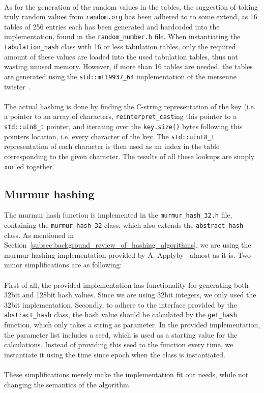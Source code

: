 \documentclass[11pt]{report} %
\begin{document}
\\
As for the generation of the random values in the tables, the suggestion of taking truly random values from \verb|random.org| has been adhered to to some extend, as 16 tables of 256 entries each has been generated and hardcoded into the implementation, found in the \verb|random_number.h| file. When instantiating the \verb|tabulation_hash| class with 16 or less tabulation tables, only the required amount of these values are loaded into the used tabulation tables, thus not wasting unused memory. However, if more than 16 tables are needed, the tables are generated using the \verb|std::mt19937_64| implementation of the mersenne twister~\cite{MT02}.\\
\\
The actual hashing is done by finding the C-string representation of the key (i.e. a pointer to an array of characters, \verb|reinterpret_cast|ing this pointer to a \verb|std::uin8_t| pointer, and iterating over the \verb|key.size()| bytes following this pointers location, i.e. every character of the key. The \verb|std::uint8_t| representation of each character is then used as an index in the table corresponding to the given character. The results of all these lookups are simply \verb|xor|'ed together.

\subsection{Murmur hashing}
\label{subsec:implementation_murmur_hash}
The murmur hash function is implemented in the \verb|murmur_hash_32.h| file, containing the \verb|murmur_hash_32| class, which also extends the \verb|abstract_hash| class. As mentioned in Section~\ref{subsec:background_review_of_hashing_algorithms}, we are using the murmur hashing implementation provided by A. Applyby~\cite{Mur3} almost as it is. Two minor simplifications are as following:\\
\\
First of all, the provided implementation has functionality for generating both 32bit and 128bit hash values. Since we are using 32bit integers, we only used the 32bit implementation. Secondly, to adhere to the interface provided by the \verb|abstract_hash| class, the hash value should be calculated by the \verb|get_hash| function, which only takes a string as parameter. In the provided implementation, the parameter list includes a seed, which is used as a starting value for the calculations. Instead of providing this seed to the function every time, we instantiate it using the time since epoch when the class is instantiated. \\
\\
These simplifications merely make the implementation fit our needs, while not changing the semantics of the algorithm.
\end{document}
